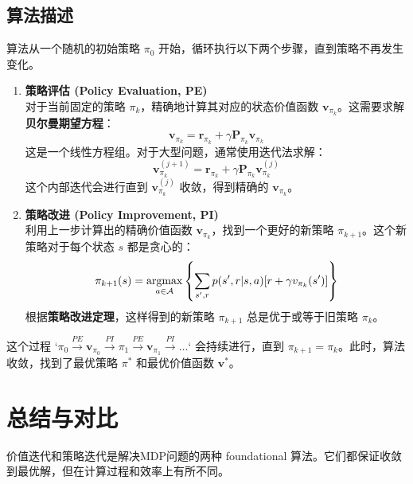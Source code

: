 \documentclass[12pt, a4paper]{article}
\newcommand{\argmax}{\operatornamewithlimits{argmax}} %
\newcommand{\vect}[1]{\mathbf{#1}} %
\begin{document}
\subsection{算法描述}
算法从一个随机的初始策略 $\pi_0$ 开始，循环执行以下两个步骤，直到策略不再发生变化。
\begin{enumerate}[label=\textbf{Step \arabic*}:, wide, labelwidth=!, labelindent=0pt]
    \item \textbf{策略评估 (Policy Evaluation, PE)} \\
    对于当前固定的策略 $\pi_k$，精确地计算其对应的状态价值函数 $\vect{v}_{\pi_k}$。这需要求解\textbf{贝尔曼期望方程}：
    \[
    \vect{v}_{\pi_k} = \vect{r}_{\pi_k} + \gamma \vect{P}_{\pi_k} \vect{v}_{\pi_k}
    \]
    这是一个线性方程组。对于大型问题，通常使用迭代法求解：
    \[
    \vect{v}_{\pi_k}^{(j+1)} = \vect{r}_{\pi_k} + \gamma \vect{P}_{\pi_k} \vect{v}_{\pi_k}^{(j)}
    \]
    这个内部迭代会进行直到 $\vect{v}_{\pi_k}^{(j)}$ 收敛，得到精确的 $\vect{v}_{\pi_k}$。

    \item \textbf{策略改进 (Policy Improvement, PI)} \\
    利用上一步计算出的精确价值函数 $\vect{v}_{\pi_k}$，找到一个更好的新策略 $\pi_{k+1}$。这个新策略对于每个状态 $s$ 都是贪心的：
    \[
    \pi_{k+1}(s) = \argmax_{a \in \mathcal{A}} \left\{ \sum_{s', r} p(s', r | s, a) [r + \gamma v_{\pi_k}(s')] \right\}
    \]
    根据\textbf{策略改进定理}，这样得到的新策略 $\pi_{k+1}$ 总是优于或等于旧策略 $\pi_k$。
\end{enumerate}
这个过程 `$\pi_0 \xrightarrow{PE} \vect{v}_{\pi_0} \xrightarrow{PI} \pi_1 \xrightarrow{PE} \vect{v}_{\pi_1} \xrightarrow{PI} \dots$` 会持续进行，直到 $\pi_{k+1} = \pi_k$。此时，算法收敛，找到了最优策略 $\pi^*$ 和最优价值函数 $\vect{v}^*$。

\section{总结与对比}
价值迭代和策略迭代是解决MDP问题的两种 foundational 算法。它们都保证收敛到最优解，但在计算过程和效率上有所不同。
\end{document}
